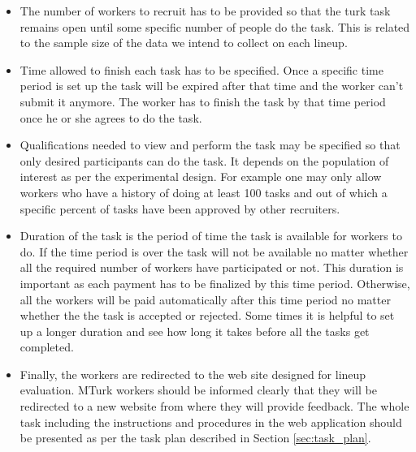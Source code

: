 \documentclass[11pt]{article}
\begin{document}
\begin{itemize}

\item The number of workers to recruit has to be provided so that the turk task remains open until some specific number of people do the task. This is related to the sample size of the data we intend to collect on each lineup. 

\item Time allowed to finish each task has to be specified. Once a specific time period is set up the task will be expired after that time and the worker can't submit it anymore. The worker has to finish the task by that time period once he or she agrees to do the task. 

\item Qualifications needed to view and perform the task may be specified so that only desired participants can do the task. It depends on the population of interest as per the experimental design. For example one may only allow workers who have a history of doing at least 100 tasks and out of which a specific percent of tasks have been approved by other recruiters. 

\item Duration of the task is the period of time the task is available for workers to do. If the time period is over the task will not be available no matter whether all the required number of workers have participated or not. This duration is important as each payment has to be finalized by this time period. Otherwise, all the workers will be paid automatically after this time period no matter whether the the task is accepted or rejected. Some times it is helpful to set up a longer duration and see how long it takes before all the tasks get completed.

\item Finally, the workers are redirected to the web site designed for lineup evaluation. MTurk workers should be informed clearly that they will be redirected to a new website from where they will provide feedback. The whole task including the instructions and procedures in the web application should be presented as per the task plan described in Section \ref{sec:task_plan}.

\end{itemize}
\end{document}
